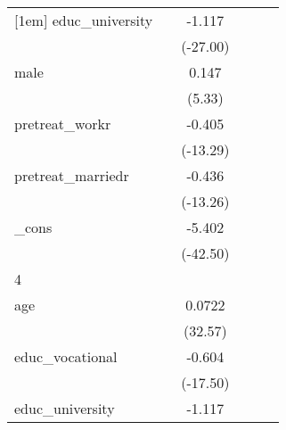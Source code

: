 {\begin{tabular}{l*{5}{c}}
[1em]
educ\_university&                     &      -1.117\sym{***}&                     &                     &                     \\
            &                     &    (-27.00)         &                     &                     &                     \\
[1em]
male        &                     &       0.147\sym{***}&                     &                     &                     \\
            &                     &      (5.33)         &                     &                     &                     \\
[1em]
pretreat\_workr&                     &      -0.405\sym{***}&                     &                     &                     \\
            &                     &    (-13.29)         &                     &                     &                     \\
[1em]
pretreat\_marriedr&                     &      -0.436\sym{***}&                     &                     &                     \\
            &                     &    (-13.26)         &                     &                     &                     \\
[1em]
\_cons      &                     &      -5.402\sym{***}&                     &                     &                     \\
            &                     &    (-42.50)         &                     &                     &                     \\
\hline
4           &                     &                     &                     &                     &                     \\
age         &                     &      0.0722\sym{***}&                     &                     &                     \\
            &                     &     (32.57)         &                     &                     &                     \\
[1em]
educ\_vocational&                     &      -0.604\sym{***}&                     &                     &                     \\
            &                     &    (-17.50)         &                     &                     &                     \\
[1em]
educ\_university&                     &      -1.117\sym{***}&                     &                     &                     \\

\end{tabular}}
